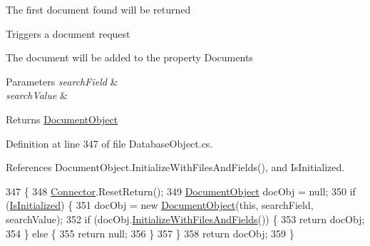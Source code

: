 The first document found will be returned

Triggers a document request

The document will be added to the property \textquotesingle{}Documents\textquotesingle{}


\begin{DoxyParams}{Parameters}
{\em search\+Field} & \\
\hline
{\em search\+Value} & \\
\hline
\end{DoxyParams}
\begin{DoxyReturn}{Returns}
\mbox{\hyperlink{class_document_object}{Document\+Object}}
\end{DoxyReturn}


Definition at line 347 of file Database\+Object.\+cs.



References Document\+Object.\+Initialize\+With\+Files\+And\+Fields(), and Is\+Initialized.


\begin{DoxyCode}
347                                                                                                     \{
348         \mbox{\hyperlink{class_connector}{Connector}}.ResetReturn();
349         \mbox{\hyperlink{class_document_object}{DocumentObject}} docObj = null;
350         \textcolor{keywordflow}{if} (\mbox{\hyperlink{class_database_object_a5fe036d32a30eb10d1b3f6a30263f740}{IsInitialized}}) \{
351             docObj = \textcolor{keyword}{new} \mbox{\hyperlink{class_document_object}{DocumentObject}}(\textcolor{keyword}{this}, searchField, searchValue);
352             \textcolor{keywordflow}{if} (docObj.\mbox{\hyperlink{class_document_object_a16350c0f471c95c82b418b7f1dc53694}{InitializeWithFilesAndFields}}()) \{
353                 \textcolor{keywordflow}{return} docObj;
354             \} \textcolor{keywordflow}{else} \{
355                 \textcolor{keywordflow}{return} null;
356             \}
357         \}
358         \textcolor{keywordflow}{return} docObj;
359     \}
\end{DoxyCode}
\mbox{\label{class_database_object_a995e2ce483797f6e53607435d58da7c4}} 
